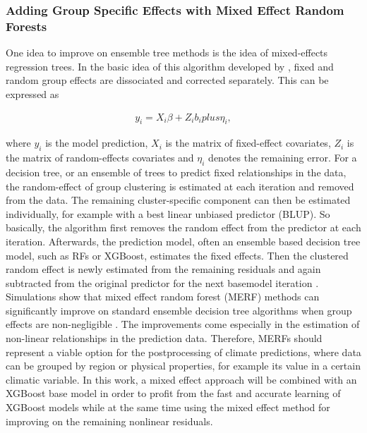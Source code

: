 \documentclass[ba-lentz.tex]{subfile}
\begin{document}
\subsubsection{Adding Group Specific Effects with Mixed Effect Random Forests}

One idea to improve on ensemble tree methods is the idea of mixed-effects regression trees.
In the basic idea of this algorithm developed by \cite{hajjem_mixed_2011}, fixed and random group effects are dissociated and corrected separately.
This can be expressed as

\begin{align}
    y_i = X_i \beta + Z_i b_i plus \eta_i ,
\end{align}

where $y_i$ is the model prediction, $X_i$ is the matrix of fixed-effect covariates, $Z_i$ is the matrix of random-effects covariates and $\eta_i$ denotes the remaining error.
For a decision tree, or an ensemble of trees \parencite{hajjem_mixed-effects_2014}to predict fixed relationships in the data, the random-effect of group clustering is estimated at each iteration and removed from the data.
The remaining cluster-specific component can then be estimated individually, for example with a best linear unbiased predictor (BLUP).
So basically, the algorithm first removes the random effect from the predictor at each iteration.
Afterwards, the prediction model, often an ensemble based decision tree model, such as RFs or XGBoost, estimates the fixed effects.
Then the clustered random effect is newly estimated from the remaining residuals and again subtracted from the original predictor for the next basemodel iteration \parencite{hajjem_mixed_2011}. \\
Simulations show that mixed effect random forest (MERF) methods can significantly improve on standard ensemble decision tree algorithms when group effects are non-negligible \parencite{hajjem_mixed-effects_2014}.
The improvements come especially in the estimation of non-linear relationships in the prediction data.
Therefore, MERFs should represent a viable option for the postprocessing of climate predictions, where data can be grouped by region or physical properties, for example its value in a certain climatic variable.
In this work, a mixed effect approach will be combined with an XGBoost base model in order to profit from the fast and accurate learning of XGBoost models while at the same time using the mixed effect method for improving on the remaining nonlinear residuals.
\end{document}

